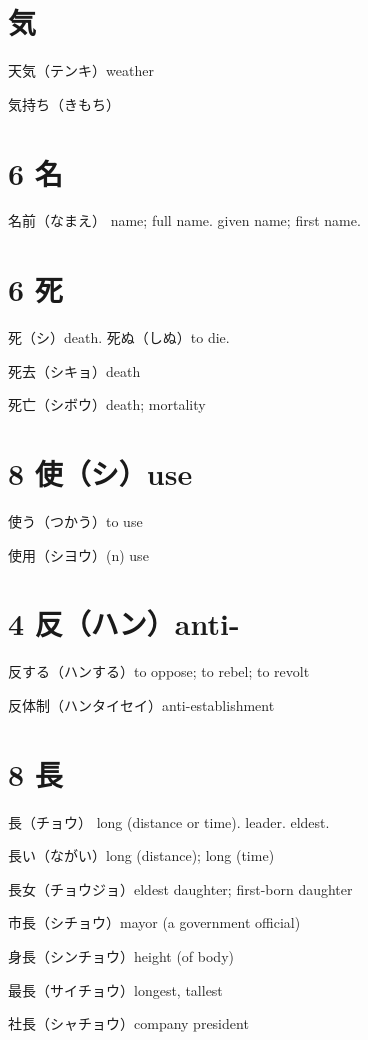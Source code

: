 \section{気}

天気（テンキ）weather

気持ち（きもち）

\section{6 名}

名前（なまえ）
name; full name.
given name; first name.

\section{6 死}

死（シ）death.
死ぬ（しぬ）to die.

死去（シキョ）death

死亡（シボウ）death; mortality

\section{8 使（シ）use}

使う（つかう）to use

使用（シヨウ）(n) use

\section{4 反（ハン）anti-}

反する（ハンする）to oppose; to rebel; to revolt

反体制（ハンタイセイ）anti-establishment

\section{8 長}

長（チョウ）
long (distance or time).
leader.
eldest.

長い（ながい）long (distance); long (time)

長女（チョウジョ）eldest daughter; first-born daughter

市長（シチョウ）mayor (a government official)

身長（シンチョウ）height (of body)

最長（サイチョウ）longest, tallest

社長（シャチョウ）company president

